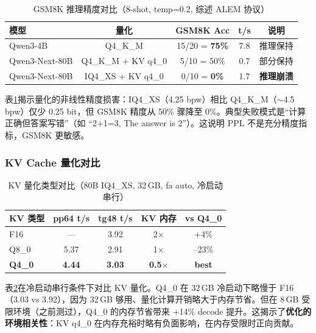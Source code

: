 \begin{table}[H]
    \centering
    \caption{GSM8K 推理精度对比（8-shot, temp=0.2, 综述 ALEM 协议）}
    \label{tab:eval_gsm8k}
    \begin{tabular}{lcccc}
        \toprule
        \textbf{模型} & \textbf{量化} & \textbf{GSM8K Acc} & \textbf{t/s} & \textbf{说明} \\
        \midrule
        Qwen3-4B & Q4\_K\_M & 15/20 = \textbf{75\%} & 7.8 & 推理保持 \\
        Qwen3-Next-80B & Q4\_K\_M + KV q4\_0 & 5/10 = 50\% & 0.7 & 部分保持 \\
        Qwen3-Next-80B & IQ4\_XS + KV q4\_0 & 0/10 = \textbf{0\%} & 1.7 & \textbf{推理崩溃} \\
        \bottomrule
    \end{tabular}
\end{table}

表\ref{tab:eval_gsm8k}揭示量化的非线性精度损害：IQ4\_XS（4.25 bpw）相比 Q4\_K\_M（$\sim$4.5 bpw）仅少 0.25 bit，但 GSM8K 精度从 50\% 骤降至 0\%。典型失败模式是“计算正确但答案写错”（如 “2+1=3, The answer is 2”）。这说明 PPL 不是充分精度指标，GSM8K 更敏感。

\subsubsection{KV Cache 量化对比}

\begin{table}[H]
    \centering
    \caption{KV 量化类型对比（80B IQ4\_XS, 32\,GB, fa auto, 冷启动串行）}
    \label{tab:eval_kv_quant}
    \begin{tabular}{lcccc}
        \toprule
        \textbf{KV 类型} & \textbf{pp64 t/s} & \textbf{tg48 t/s} & \textbf{KV 内存} & \textbf{vs Q4\_0} \\
        \midrule
        F16 & --- & 3.92 & 2$\times$ & +4\% \\
        Q8\_0 & 5.37 & 2.91 & 1$\times$ & --23\% \\
        \textbf{Q4\_0} & \textbf{4.44} & \textbf{3.03} & \textbf{0.5$\times$} & \textbf{best} \\
        \bottomrule
    \end{tabular}
\end{table}

表\ref{tab:eval_kv_quant}在冷启动串行条件下对比 KV 量化。Q4\_0 在 32\,GB 冷启动下略慢于 F16（3.03 vs 3.92），因为 32\,GB 够用、量化计算开销略大于内存节省。但在 8\,GB 受限环境（之前测过），Q4\_0 的内存节省带来 +14\% decode 提升。这揭示了\textbf{优化的环境相关性}：KV q4\_0 在内存充裕时略有负面影响，在内存受限时正向贡献。

